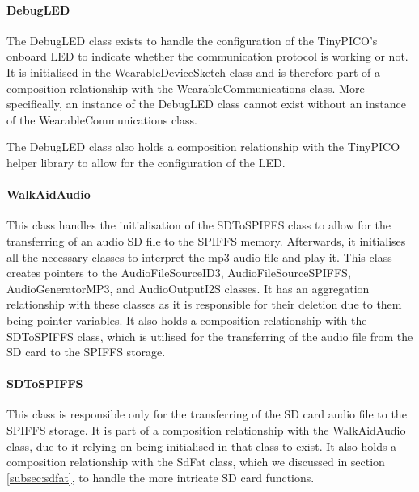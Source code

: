                 \paragraph{DebugLED}\mbox{}

                    The DebugLED class exists to handle the configuration of the TinyPICO's onboard LED to indicate whether the communication protocol is working or not. It is initialised in the WearableDeviceSketch class and is therefore part of a composition relationship with the WearableCommunications class. More specifically, an instance of the DebugLED class cannot exist without an instance of the WearableCommunications class.

                    The DebugLED class also holds a composition relationship with the TinyPICO helper library to allow for the configuration of the LED.

                \paragraph{WalkAidAudio}\mbox{}

                    This class handles the initialisation of the SDToSPIFFS class to allow for the transferring of an audio SD file to the SPIFFS memory. Afterwards, it initialises all the necessary classes to interpret the mp3 audio file and play it. This class creates pointers to the AudioFileSourceID3, AudioFileSourceSPIFFS, AudioGeneratorMP3, and AudioOutputI2S classes. It has an aggregation relationship with these classes as it is responsible for their deletion due to them being pointer variables. It also holds a composition relationship with the SDToSPIFFS class, which is utilised for the transferring of the audio file from the SD card to the SPIFFS storage. 

                \paragraph{SDToSPIFFS}\mbox{}

                    This class is responsible only for the transferring of the SD card audio file to the SPIFFS storage. It is part of a composition relationship with the WalkAidAudio class, due to it relying on being initialised in that class to exist. It also holds a composition relationship with the SdFat class, which we discussed in section \ref{subsec:sdfat}, to handle the more intricate SD card functions. 
                
